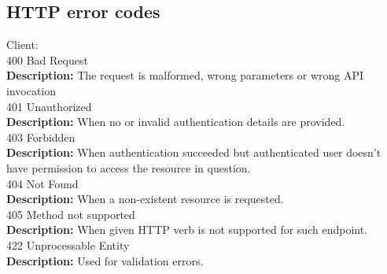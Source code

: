 \documentclass[11pt,a4paper,pdftex]{article}
\begin{document}
\subsection{HTTP error codes}
\hspace*{1em}Client:\\
\hspace*{2em}400 Bad Request\\
\hspace*{3em}\textbf{Description:} The request is malformed, wrong parameters or wrong API invocation\\
\hspace*{2em}401 Unauthorized\\
\hspace*{3em}\textbf{Description:} When no or invalid authentication details are provided.\\
\hspace*{2em}403 Forbidden\\
\hspace*{3em}\textbf{Description:} When authentication succeeded but authenticated user doesn't have permission to access the resource in question.\\
\hspace*{2em}404 Not Found\\
\hspace*{3em}\textbf{Description:} When a non-existent resource is requested.\\
\hspace*{2em}405 Method not supported\\
\hspace*{3em}\textbf{Description:} When given HTTP verb is not supported for such endpoint.\\
\hspace*{2em}422 Unprocessable Entity\\
\hspace*{3em}\textbf{Description:} Used for validation errors.
   
\end{document}
